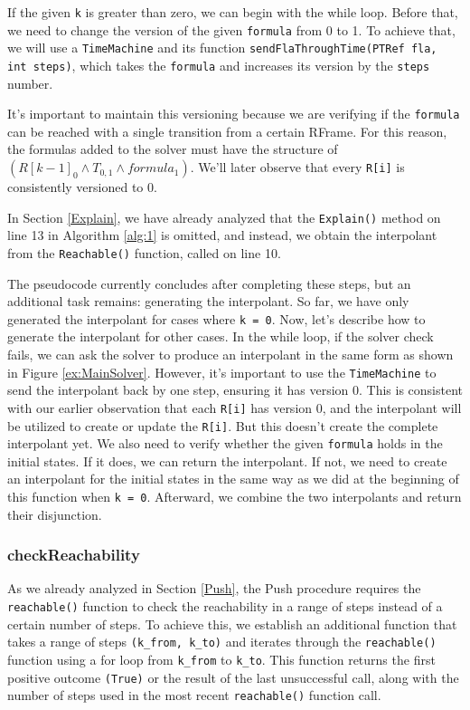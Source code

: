 If the given \texttt{k} is greater than zero, we can begin with the while loop. Before that, we need to change the version of the given \texttt{formula} from 0 to 1. To achieve that, we will use a \texttt{TimeMachine} and its function \texttt{sendFlaThroughTime(PTRef fla, int steps)}, which takes the \texttt{formula} and increases its version by the \texttt{steps} number.

It's important to maintain this versioning because we are verifying if the \texttt{formula} can be reached with a single transition from a certain RFrame. For this reason, the formulas added to the solver must have the structure of $(R[k-1]_0 \wedge T_{0,1} \wedge formula_1)$. We'll later observe that every \texttt{R[i]} is consistently versioned to 0.

In Section \ref{Explain}, we have already analyzed that the \texttt{Explain()} method on line 13 in Algorithm \ref{alg:1} is omitted, and instead, we obtain the interpolant from the \texttt{Reachable()} function, called on line 10.

The pseudocode currently concludes after completing these steps, but an additional task remains: generating the interpolant. So far, we have only generated the interpolant for cases where \texttt{k = 0}. Now, let's describe how to generate the interpolant for other cases. In the while loop, if the solver check fails, we can ask the solver to produce an interpolant in the same form as shown in Figure \ref{ex:MainSolver}. However, it's important to use the \texttt{TimeMachine} to send the interpolant back by one step, ensuring it has version 0. This is consistent with our earlier observation that each \texttt{R[i]} has version 0, and the interpolant will be utilized to create or update the \texttt{R[i]}. But this doesn't create the complete interpolant yet. We also need to verify whether the given \texttt{formula} holds in the initial states. If it does, we can return the interpolant. If not, we need to create an interpolant for the initial states in the same way as we did at the beginning of this function when \texttt{k = 0}. Afterward, we combine the two interpolants and return their disjunction.

\subsubsection{checkReachability}

\noindent As we already analyzed in Section \ref{Push}, the Push procedure requires the \texttt{reachable()} function to check the reachability in a range of steps instead of a certain number of steps. To achieve this, we establish an additional function that takes a range of steps \texttt{(k\_from, k\_to)} and iterates through the \texttt{reachable()} function using a for loop from \texttt{k\_from} to \texttt{k\_to}. This function returns the first positive outcome \texttt{(True)} or the result of the last unsuccessful call, along with the number of steps used in the most recent \texttt{reachable()} function call.

